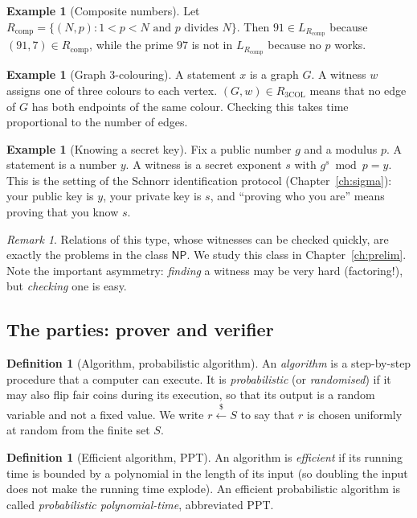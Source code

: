 \documentclass[11pt,a4paper]{report}
\theoremstyle{plain}
\theoremstyle{definition}
\newtheorem{definition}[theorem]{Definition}
\newtheorem{example}[theorem]{Example}
\theoremstyle{remark}
\newtheorem{remark}[theorem]{Remark}
\newcommand{\getsr}{\xleftarrow{\$}}
\newcommand{\PPT}{\mathrm{PPT}}
\newcommand{\NP}{\mathsf{NP}}\newcommand{\BPP}{\mathsf{BPP}}\newcommand{\IP}{\mathsf{IP}}
\begin{document}
\begin{example}[Composite numbers]\label{ex:intro-composite}
Let $R_{\text{comp}} = \{(N,p) : 1<p<N \text{ and } p \text{ divides } N\}$. Then $91\in L_{R_{\text{comp}}}$ because $(91,7)\in R_{\text{comp}}$, while the prime $97$ is not in $L_{R_{\text{comp}}}$ because no $p$ works.
\end{example}

\begin{example}[Graph 3-colouring]\label{ex:intro-3col}
A statement $x$ is a graph $G$. A witness $w$ assigns one of three colours to each vertex. $(G,w)\in R_{\text{3COL}}$ means that no edge of $G$ has both endpoints of the same colour. Checking this takes time proportional to the number of edges.
\end{example}

\begin{example}[Knowing a secret key]\label{ex:intro-dlog}
Fix a public number $g$ and a modulus $p$. A statement is a number $y$. A witness is a secret exponent $s$ with $g^s \bmod p=y$. This is the setting of the Schnorr identification protocol (Chapter~\ref{ch:sigma}): your public key is $y$, your private key is $s$, and ``proving who you are'' means proving that you know $s$.
\end{example}

\begin{remark}
Relations of this type, whose witnesses can be checked quickly, are exactly the problems in the class $\NP$. We study this class in Chapter~\ref{ch:prelim}.
Note the important asymmetry: \emph{finding} a witness may be very hard (factoring!), but \emph{checking} one is easy.
\end{remark}

\subsection{The parties: prover and verifier}
\begin{definition}[Algorithm, probabilistic algorithm]
An \emph{algorithm} is a step-by-step procedure that a computer can execute. It is \emph{probabilistic} (or \emph{randomised}) if it may also flip fair coins during its execution, so that its output is a random variable and not a fixed value. We write $r\getsr S$ to say that $r$ is chosen uniformly at random from the finite set $S$.
\end{definition}

\begin{definition}[Efficient algorithm, PPT]\label{def:intro-ppt}
An algorithm is \emph{efficient} if its running time is bounded by a polynomial in the length of its input (so doubling the input does not make the running time explode). An efficient probabilistic algorithm is called \emph{probabilistic polynomial-time}, abbreviated $\PPT$.
\end{definition}
\end{document}
